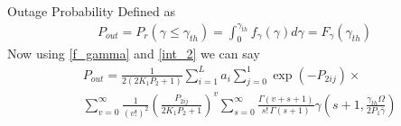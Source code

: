 \documentclass{beamer}
\begin{document}
\begin{frame}{}
    \begin{block}{Outage Probability}
    Defined as 
    \begin{align}
        P_{out}=P_r(\gamma \leq \gamma_{th})=\int_0^{\gamma_{th}} f_{\gamma}(\gamma) d\gamma  =F_{\gamma} (\gamma_{th})
    \end{align}
    Now using \eqref{f_gamma} and \eqref{int_2} we can say
    \begin{align}
        &P_{out}=\frac{1}{2(2K_1P_2+1)} \sum_{i=1}^{L} a_i  \sum_{j=0}^{1} 
     \exp(-P_{2ij})  \times \label{Outage}\\ \nonumber
    &\sum_{v=0}^\infty \frac{1}{(v!)^2}\left(\frac{P_{2ij}}{2K_1P_2+1}\right)^v
    \sum_{s=0}^\infty  \frac{\Gamma(v+s+1)}{s!\,\Gamma(s+1)} \gamma\left(s+1,\frac{\gamma_{th} \Omega}{2P_1 \bar{\gamma}}\right)
    \end{align}
    \end{block}
\end{frame}
\end{document}

